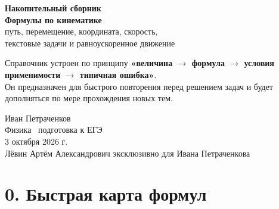 \documentclass[a4paper,12pt]{article}
\begin{document}
\thispagestyle{empty}
\begin{center}
\vspace*{25mm}
{\Large\color{accent}\textbf{Накопительный сборник}}\\[8mm]
{\huge\bfseries Формулы по кинематике}\\[4mm]
{\Large путь, перемещение, координата, скорость,\\
текстовые задачи и равноускоренное движение}\\[16mm]

\begin{minipage}{0.80\textwidth}
\centering
\large
Справочник устроен по принципу \textbf{«величина $\rightarrow$ формула $\rightarrow$ условия применимости $\rightarrow$ типичная ошибка»}.\\[2mm]
Он предназначен для быстрого повторения перед решением задач и будет дополняться по мере прохождения новых тем.
\end{minipage}

\vfill
{\large Иван Петраченков}\\[3mm]
{\large Физика \textbullet\ подготовка к ЕГЭ}\\[6mm]
{\large 3 октября 2026 г.}\\[7mm]
{\normalsize\color{textgray}Лёвин Артём Александрович эксклюзивно для Ивана Петраченкова}
\end{center}


\clearpage

\section*{0. Быстрая карта формул}
\small
\end{document}
